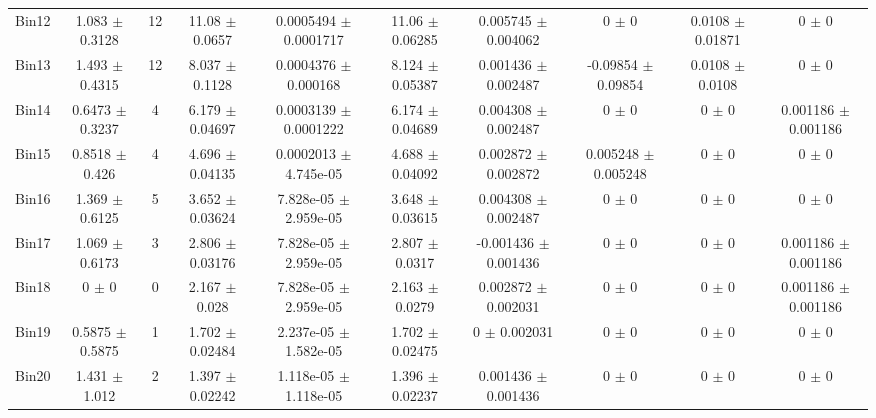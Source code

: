\begin{tabular}{@{\extracolsep{4pt}}lccccccccc@{}}
     Bin12 & 1.083 $\pm$ 0.3128 & 12 & 11.08 $\pm$ 0.0657 & 0.0005494 $\pm$ 0.0001717 & 11.06 $\pm$ 0.06285 & 0.005745 $\pm$ 0.004062 & 0 $\pm$ 0 & 0.0108 $\pm$ 0.01871 & 0 $\pm$ 0 \\ 
     Bin13 & 1.493 $\pm$ 0.4315 & 12 & 8.037 $\pm$ 0.1128 & 0.0004376 $\pm$ 0.000168 & 8.124 $\pm$ 0.05387 & 0.001436 $\pm$ 0.002487 & -0.09854 $\pm$ 0.09854 & 0.0108 $\pm$ 0.0108 & 0 $\pm$ 0 \\ 
     Bin14 & 0.6473 $\pm$ 0.3237 & 4 & 6.179 $\pm$ 0.04697 & 0.0003139 $\pm$ 0.0001222 & 6.174 $\pm$ 0.04689 & 0.004308 $\pm$ 0.002487 & 0 $\pm$ 0 & 0 $\pm$ 0 & 0.001186 $\pm$ 0.001186 \\ 
     Bin15 & 0.8518 $\pm$ 0.426 & 4 & 4.696 $\pm$ 0.04135 & 0.0002013 $\pm$ 4.745e-05 & 4.688 $\pm$ 0.04092 & 0.002872 $\pm$ 0.002872 & 0.005248 $\pm$ 0.005248 & 0 $\pm$ 0 & 0 $\pm$ 0 \\ 
     Bin16 & 1.369 $\pm$ 0.6125 & 5 & 3.652 $\pm$ 0.03624 & 7.828e-05 $\pm$ 2.959e-05 & 3.648 $\pm$ 0.03615 & 0.004308 $\pm$ 0.002487 & 0 $\pm$ 0 & 0 $\pm$ 0 & 0 $\pm$ 0 \\ 
     Bin17 & 1.069 $\pm$ 0.6173 & 3 & 2.806 $\pm$ 0.03176 & 7.828e-05 $\pm$ 2.959e-05 & 2.807 $\pm$ 0.0317 & -0.001436 $\pm$ 0.001436 & 0 $\pm$ 0 & 0 $\pm$ 0 & 0.001186 $\pm$ 0.001186 \\ 
     Bin18 & 0 $\pm$ 0 & 0 & 2.167 $\pm$ 0.028 & 7.828e-05 $\pm$ 2.959e-05 & 2.163 $\pm$ 0.0279 & 0.002872 $\pm$ 0.002031 & 0 $\pm$ 0 & 0 $\pm$ 0 & 0.001186 $\pm$ 0.001186 \\ 
     Bin19 & 0.5875 $\pm$ 0.5875 & 1 & 1.702 $\pm$ 0.02484 & 2.237e-05 $\pm$ 1.582e-05 & 1.702 $\pm$ 0.02475 & 0 $\pm$ 0.002031 & 0 $\pm$ 0 & 0 $\pm$ 0 & 0 $\pm$ 0 \\ 
     Bin20 & 1.431 $\pm$ 1.012 & 2 & 1.397 $\pm$ 0.02242 & 1.118e-05 $\pm$ 1.118e-05 & 1.396 $\pm$ 0.02237 & 0.001436 $\pm$ 0.001436 & 0 $\pm$ 0 & 0 $\pm$ 0 & 0 $\pm$ 0 \\ 
\hline\hline
  \end{tabular}
